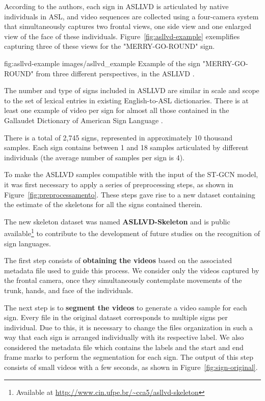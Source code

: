 According to the authors, each sign in ASLLVD is articulated by native individuals in ASL, and video sequences are collected using a four-camera system that simultaneously captures two frontal views, one side view and one enlarged view of the face of these individuals. Figure~\ref{fig:asllvd-example} exemplifies capturing three of these views for the "MERRY-GO-ROUND" sign. 

\image
    {fig:asllvd-example}
    {images/asllvd_example}
    {Example of the sign "MERRY-GO-ROUND" from three different perspectives, in the ASLLVD \cite[p. 2]{athitsos-asllvd-2008}.}
    
The number and type of signs included in ASLLVD are similar in scale and scope to the set of lexical entries in existing English-to-ASL dictionaries. There is at least one example of video per sign for almost all those contained in the Gallaudet Dictionary of American Sign Language \cite{athitsos-asllvd-2008, gallaudet-2005}.

There is a total of 2,745 signs, represented in approximately 10 thousand samples. Each sign contains between 1 and 18 samples articulated by different individuals (the average number of samples per sign is 4).

To make the ASLLVD samples compatible with the input of the ST-GCN model, it was first necessary to apply a series of preprocessing steps, as shown in Figure~\ref{fig:preprocessamento}. These steps gave rise to a new dataset containing the estimate of the skeletons for all the signs contained therein.

The new skeleton dataset was named \textbf{ASLLVD-Skeleton} and is public available\footnote{
   Available at \url{http://www.cin.ufpe.br/~cca5/asllvd-skeleton}
} to contribute to the development of future studies on the recognition of sign languages.

The first step consists of \textbf{obtaining the videos} based on the associated metadata file used to guide this process. We consider only the videos captured by the frontal camera, once they simultaneously contemplate movements of the trunk, hands, and face of the individuals.

The next step is to \textbf{segment the videos} to generate a video sample for each sign. Every file in the original dataset corresponds to multiple signs per individual. Due to this, it is necessary to change the files organization in such a way that each sign is arranged individually with its respective label. We also considered the metadata file which contains the labels and the start and end frame marks to perform the segmentation for each sign. The output of this step consists of small videos with a few seconds, as shown in Figure~\ref{fig:sign-original}.

